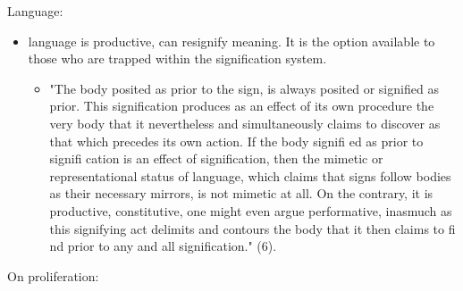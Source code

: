 \documentclass[11pt]{article}
\begin{document}
Language:
\begin{itemize}
\item language is productive, can resignify meaning. It is the option
available to those who are trapped within the signification system.
\begin{itemize}
\item "The body posited as prior to the sign, is always posited or
signified as prior. This signification produces as an effect of
its own procedure the very body that it nevertheless and
simultaneously claims to discover as that which precedes its own
action. If the body signifi ed as prior to signifi cation is an
effect of signification, then the mimetic or representational
status of language, which claims that signs follow bodies as their
necessary mirrors, is not mimetic at all. On the contrary, it is
productive, constitutive, one might even argue performative,
inasmuch as this signifying act delimits and contours the body
that it then claims to fi nd prior to any and all signification."
(6).
\end{itemize}
\end{itemize}

On proliferation:
\end{document}
